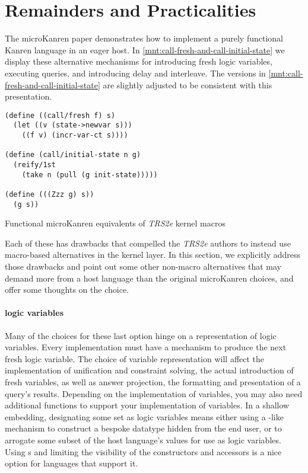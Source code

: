 \documentclass[sigplan,balance,pbalance,natbib=false]{acmart}
\begin{document}
\section{Remainders and Practicalities}\label{sec:functional}

The \citeyear{hemann2013muKanren} microKanren paper demonstrates how
to implement a purely functional Kanren language in an eager host. In
\cref{mnt:call-fresh-and-call-initial-state} we display these
alternative mechanisms for introducing fresh logic variables,
executing queries, and introducing delay and interleave. The versions
in \cref{mnt:call-fresh-and-call-initial-state} are slightly adjusted
to be consistent with this presentation.

\begin{listing}
  \begin{verbatim}
(define ((call/fresh f) s)
  (let ((v (state->newvar s)))
    ((f v) (incr-var-ct s))))

(define (call/initial-state n g)
  (reify/1st
    (take n (pull (g init-state)))))

(define (((Zzz g) s))
  (g s))
  \end{verbatim}
  \caption{Functional microKanren equivalents of \emph{TRS2e} kernel macros}\label{mnt:call-fresh-and-call-initial-state}
\end{listing}

Each of these has drawbacks that compelled the \emph{TRS2e} authors to
instead use macro-based alternatives in the kernel layer. In this
section, we explicitly address those drawbacks and point out some
other non-macro alternatives that may demand more from a host language
than the original microKanren choices, and offer some thoughts on the
choice.

\paragraph{logic variables}

Many of the choices for these last option hinge on a representation of
logic variables. Every implementation must have a mechanism to produce
the next fresh logic variable. The choice of variable representation
will affect the implementation of unification and constraint solving,
the actual introduction of fresh variables, as well as answer
projection, the formatting and presentation of a query's results.
Depending on the implementation of variables, you may also need
additional functions to support your implementation of variables. In a
shallow embedding, designating some set as logic variables means
either using a -like mechanism to construct a
bespoke datatype hidden from the end user, or to arrogate some subset
of the host language's values for use as logic variables.
Using s and limiting the visibility of the
constructors and accessors is a nice option for languages that support
it.
\end{document}
